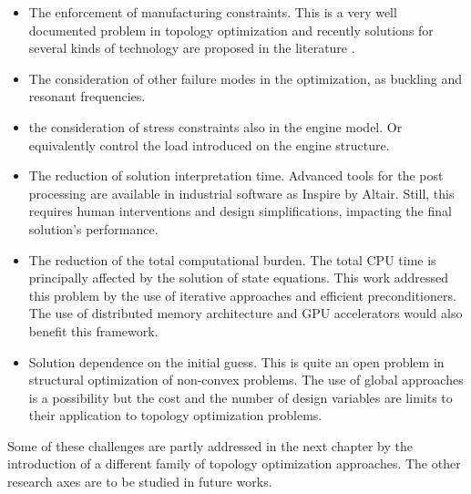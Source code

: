 \begin{itemize}
\item The enforcement of manufacturing constraints. This is a very well documented problem in topology optimization and recently solutions for several kinds of technology are proposed in the literature \cite{liu_current_2018}.
\item The consideration of other failure modes in the optimization, as buckling and resonant frequencies.
\item the consideration of stress constraints also in the engine model. Or equivalently control the load introduced on the engine structure.
\item The reduction of solution interpretation time. Advanced tools for the post processing are available in industrial software as Inspire by Altair. Still, this requires human interventions and design simplifications, impacting the final solution's performance.  
\item The reduction of the total computational burden. The total CPU time is principally affected by the solution of state equations. This work addressed this problem by the use of iterative approaches and efficient preconditioners. The use of distributed memory architecture \cite{aage2017giga} and GPU accelerators \cite{wadbro2009megapixel} would also benefit this framework.
\item Solution dependence on the initial guess. This is quite an open problem in structural optimization of non-convex problems. The use of global approaches \cite{simon2013evolutionary} is a possibility but the cost and the number of design variables are limits to their application to topology optimization problems.
\end{itemize}
Some of these challenges are partly addressed in the next chapter by the introduction of a different family of topology optimization approaches. The other research axes are to be studied in future works. 

